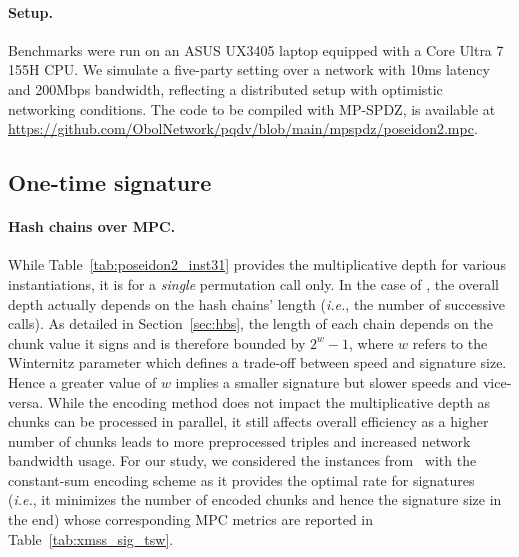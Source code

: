 \paragraph{Setup.}
Benchmarks were run on an ASUS UX3405 laptop equipped with a Core Ultra 7 155H CPU.
We simulate a five-party setting over a network with 10ms latency and 200Mbps bandwidth, reflecting a distributed setup with optimistic networking conditions.
The code to be compiled with MP-SPDZ, is available at \url{https://github.com/ObolNetwork/pqdv/blob/main/mpspdz/poseidon2.mpc}.

\subsection{One-time signature}
\paragraph{Hash chains over MPC.}
While Table~\ref{tab:poseidon2_inst31} provides the multiplicative depth for various \PoseidonTwo instantiations, it is for a \textit{single} permutation call only.
In the case of \WOTS, the overall depth actually depends on the hash chains' length (\textit{i.e.}, the number of successive \PoseidonTwoPi calls).
As detailed in Section~\ref{sec:hbs}, the length of each chain depends on the chunk value it signs and is therefore bounded by $2^w-1$, where $w$ refers to the Winternitz parameter which defines a trade-off between speed and signature size.
Hence a greater value of $w$ implies a smaller signature but slower speeds and vice-versa.
While the encoding method does not impact the multiplicative depth as chunks can be processed in parallel, it still affects overall efficiency as a higher number of chunks leads to more preprocessed triples and increased network bandwidth usage.
For our study, we considered the \XMSS instances from~\cite{cryptoeprint:2025/055} with the constant-sum encoding scheme as it provides the optimal rate for \WOTS signatures~\cite{10.1007/978-3-031-38554-4_15} (\textit{i.e.}, it minimizes the number of encoded chunks and hence the signature size in the end) whose corresponding MPC metrics are reported in Table~\ref{tab:xmss_sig_tsw}.
\renewcommand\arraystretch{1.25}
